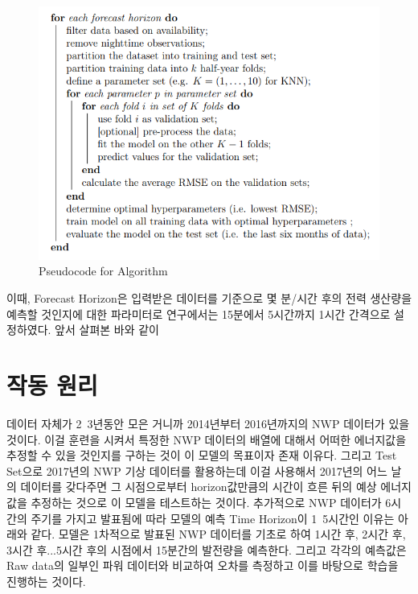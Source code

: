 \documentclass{article}
\begin{document}
\begin{figure}[h]
\centering
\includegraphics[scale=0.70]{./fig/Figure_6.png}
\caption{Pseudocode for Algorithm}
\label{fig_4}
\end{figure}

이때, Forecast Horizon은 입력받은 데이터를 기준으로 몇 분/시간 후의 전력 생산량을 예측할 것인지에 대한 파라미터로 연구에서는 15분에서 5시간까지 1시간 간격으로 설정하였다. 앞서 살펴본 바와 같이

\section{작동 원리}
데이터 자체가 2~3년동안 모은 거니까 2014년부터 2016년까지의 NWP 데이터가 있을 것이다. 이걸 훈련을 시켜서 특정한 NWP 데이터의 배열에 대해서 어떠한 에너지값을 추정할 수 있을 것인지를 구하는 것이 이 모델의 목표이자 존재 이유다.
그리고 Test Set으로 2017년의 NWP 기상 데이터를 활용하는데 이걸 사용해서 2017년의 어느 날의 데이터를 갖다주면 그 시점으로부터 horizon값만큼의 시간이 흐른 뒤의 예상 에너지값을 추정하는 것으로 이 모델을 테스트하는 것이다. 추가적으로 NWP 데이터가 6시간의 주기를 가지고 발표됨에 따라 모델의 예측 Time Horizon이 1~5시간인 이유는 아래와 같다. 모델은 1차적으로 발표된 NWP 데이터를 기초로 하여 1시간 후, 2시간 후, 3시간 후...5시간 후의 시점에서 15분간의 발전량을 예측한다. 그리고 각각의 예측값은 Raw data의 일부인 파워 데이터와 비교하여 오차를 측정하고 이를 바탕으로 학습을 진행하는 것이다.
\end{document}
